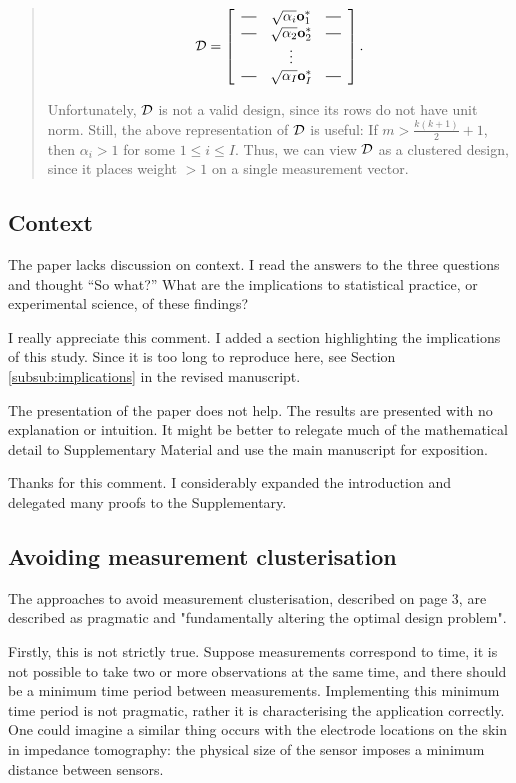 \begin{quote}
  \[
  \opt =
  \left[
    \begin{array}{ccc}
      \horzbar & \sqrt{\alpha_i} \meas^*_1 & \horzbar \\
      \horzbar & \sqrt{\alpha_2} \meas_2^* & \horzbar \\
      & \vdots    &          \\
      \horzbar & \sqrt{\alpha_I} \meas_I^* & \horzbar \\
    \end{array}
    \right].
  \]
  
  Unfortunately, $\mathcal{D}$ is not a valid design, since its rows do not
  have unit norm. Still, the above representation of $\mathcal{D}$ is useful:
  If $m > \frac{k(k+1)}{2} + 1$, then $\alpha_i > 1$ for some $1\leq i
  \leq I$.  Thus, we can view $\mathcal{D}$ as a clustered design, since it
  places weight $>1$ on a single measurement vector.
\end{quote}


\subsection{Context}
\RC The paper lacks discussion on context. I read the answers to the
three questions and thought “So what?”  What are the implications to
statistical practice, or experimental science, of these findings?

\AR I really appreciate this comment. I added a section highlighting
the implications of this study. Since it is too long to reproduce
here, see Section \ref{subsub:implications} in the revised manuscript.


\RC The presentation of the paper does not help. The results are
presented with no explanation or intuition. It might be better to
relegate much of the mathematical detail to Supplementary Material and
use the main manuscript for exposition.

\AR Thanks for this comment. I considerably expanded the
  introduction and delegated many proofs to the Supplementary.


\subsection{Avoiding measurement clusterisation}
\RC The approaches to avoid measurement clusterisation, described on page
3, are described as pragmatic and "fundamentally altering the optimal
design problem".

\RC Firstly, this is not strictly true. Suppose measurements correspond to
time, it is not possible to take two or more observations at the same
time, and there should be a minimum time period between measurements.
Implementing this minimum time period is not pragmatic, rather it is
characterising the application correctly. One could imagine a similar
thing occurs with the electrode locations on the skin in impedance
tomography: the physical size of the sensor imposes a minimum
distance between sensors.

